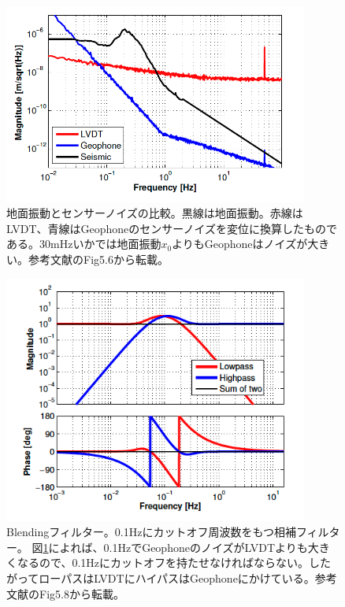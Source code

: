 \documentclass[a4paper,12pt]{jsarticle}
\begin{document}
\begin{figure}[H]
  \begin{center}
    \includegraphics[width=10.0cm]{./img_seismo_vs_lvdt.png}
  \end{center}
  \caption{地面振動とセンサーノイズの比較。黒線は地面振動。赤線はLVDT、青線はGeophoneのセンサーノイズを変位に換算したものである。30mHzいかでは地面振動$x_0$よりもGeophoneはノイズが大きい。参考文献\cite{sekiguchiD2016}のFig5.6から転載。}
  \label{img:img_seismo_vs_lvdt}
\end{figure}

\begin{figure}[H]
  \begin{center}
    \includegraphics[width=10.0cm]{./img_pi_blending.png}
  \end{center}
  \caption{Blendingフィルター。0.1Hzにカットオフ周波数をもつ相補フィルター。
    図\ref{img:img_seismo_vs_lvdt}によれば、0.1HzでGeophoneのノイズがLVDTよりも大きくなるので、0.1Hzにカットオフを持たせなければならない。したがってローパスはLVDTにハイパスはGeophoneにかけている。参考文献\cite{sekiguchiD2016}のFig5.8から転載。}
  \label{img:img_pi_blending}
\end{figure}
\end{document}
